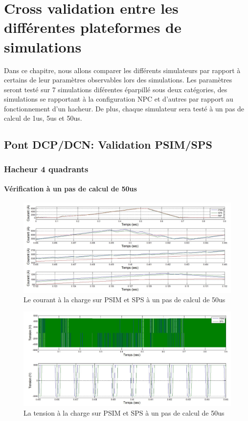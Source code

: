 \documentclass[11pt,letterpaper,final]{report}
\begin{document}
\chapter{Cross validation entre les différentes plateformes de simulations}
Dans ce chapitre, nous allons comparer les différents simulateurs par rapport à certains de leur paramètres observables lors des simulations. Les paramètres seront testé sur  7 simulations diférentes éparpillé sous deux catégories, des simulations se rapportant à la configuration NPC et d'autres par rapport au fonctionnement d'un hacheur. De plus, chaque simulateur sera testé à un pas de calcul de 1us, 5us et 50us.
\section{Pont DCP/DCN: Validation PSIM/SPS}
\subsection{Hacheur 4 quadrants}
\subsubsection{Vérification à un pas de calcul de 50us}


\begin{figure}[h!]
\centering
\includegraphics[scale=0.5]{Fig/Hacheur4Quadrants/HacheurCourantCharge50u.jpg}
\caption{Le courant à la charge sur PSIM et SPS à un pas de calcul de 50us}
\label{comp_PSIM_SPS}
\end{figure}


\begin{figure}[h!]
\centering
\includegraphics[scale=0.5]{Fig/Hacheur4Quadrants/HacheurTensionCharge50u.jpg}
\caption{La tension à la charge sur PSIM et SPS à un pas de calcul de 50us}
\label{err_cou}
\end{figure}
\end{document}
